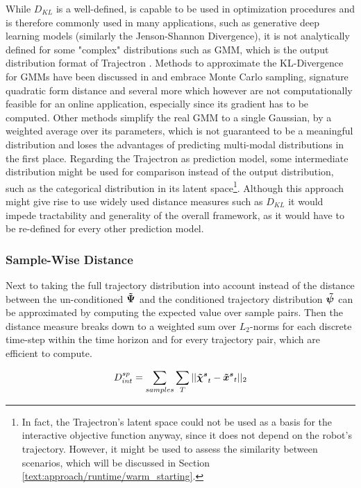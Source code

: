 While $D_{KL}$ is a well-defined, is capable to be used in optimization procedures and is therefore commonly used in many applications, such as generative deep learning models \cite{Goodfellow2014}\cite{Salzmann2020} (similarly the Jenson-Shannon Divergence), it is not analytically defined for some "complex" distributions such as \ac{GMM}, which is the output distribution format of Trajectron \cite{Ivanovic2018}. Methods to approximate the KL-Divergence for \ac{GMM}s have been discussed in \cite{Cui2015} and embrace Monte Carlo sampling, signature quadratic form distance \cite{Beecks2011} and several more which however are not computationally feasible for an online application, especially since its gradient has to be computed. Other methods simplify the real \ac{GMM} to a single Gaussian, by a weighted average over its parameters, which is not guaranteed to be a meaningful distribution and loses the advantages of predicting multi-modal distributions in the first place. 
\newline
Regarding the Trajectron \cite{Ivanovic2018} as prediction model, some intermediate distribution might be used for comparison instead of the output distribution, such as the categorical distribution in its latent space\footnote{In fact, the Trajectron's latent space could not be used as a basis for the interactive objective function anyway, since it does not depend on the robot's trajectory. However, it might be used to assess the similarity between scenarios, which will be discussed in Section \ref{text:approach/runtime/warm_starting}.}. Although this approach might give rise to use widely used distance measures such as $D_{KL}$ it would impede tractability and generality of the overall framework, as it would have to be re-defined for every other prediction model. 

\subsubsection{Sample-Wise Distance}
Next to taking the full trajectory distribution into account instead of the distance between the un-conditioned $\distwo[]$ and the conditioned trajectory distribution $\dist[]$ can be approximated by computing the expected value over sample pairs. Then the distance measure breaks down to a weighted sum over $L_2$-norms for each discrete time-step within the time horizon and for every trajectory pair, which are efficient to compute. 

\begin{equation}
D_{int}^{sp} = \sum_{samples} \sum_T ||\xpedwo[s]_t - \xped[s]_t||_2
\end{equation}

